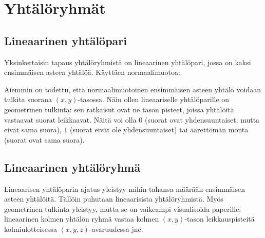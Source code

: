 \section{Yhtälöryhmät} %


\subsection*{Lineaarinen yhtälöpari}

Yksinkertaisin tapaus yhtälöryhmistä on lineaarinen yhtälöpari, jossa on
kaksi ensimmäisen asteen yhtälöä. Käyttäen normaalimuotoa:


Aiemmin on todettu, että normaalimuotoinen ensimmäisen asteen yhtälö voidaan tulkita suorana
$(x, y)$-tasossa. Näin ollen lineaariselle yhtälöparille on geometrinen tulkinta: sen
ratkaisut ovat ne tason pisteet, joissa yhtälöitä vastaavat
suorat leikkaavat. Näitä voi olla $0$ (suorat ovat yhdensuuntaiset,
mutta eivät sama suora), $1$ (suorat eivät ole yhdensuuntaiset) tai äärettömän monta (suorat ovat sama suora).


\subsection*{Lineaarinen yhtälöryhmä}

Lineaarisen yhtälöparin ajatus yleistyy mihin tahansa määrään ensimmäisen asteen yhtälöitä.
Tällöin puhutaan lineaarisista yhtälöryhmistä. Myös geometrinen tulkinta yleistyy, mutta se on vaikeampi
visualisoida paperille: lineaarinen kolmen yhtälön ryhmä vastaa kolmen $(x, y)$-tason leikkauspisteitä
kolmiulotteisessa $(x, y, z)$-avaruudessa jne.
